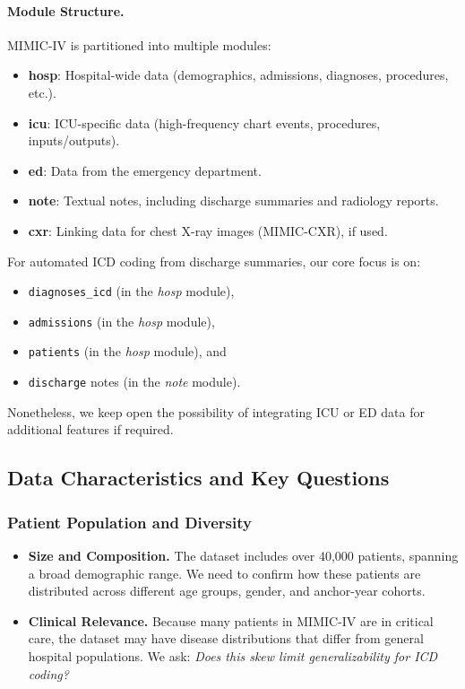 \paragraph{Module Structure.}
MIMIC-IV is partitioned into multiple modules:
\begin{itemize}
  \item \textbf{hosp}: Hospital-wide data (demographics, admissions, diagnoses, procedures, etc.).
  \item \textbf{icu}: ICU-specific data (high-frequency chart events, procedures, inputs/outputs).
  \item \textbf{ed}: Data from the emergency department.
  \item \textbf{note}: Textual notes, including discharge summaries and radiology reports.
  \item \textbf{cxr}: Linking data for chest X-ray images (MIMIC-CXR), if used.
\end{itemize}
For automated ICD coding from discharge summaries, our core focus is on:
\begin{itemize}
  \item \texttt{diagnoses\_icd} (in the \emph{hosp} module),
  \item \texttt{admissions} (in the \emph{hosp} module),
  \item \texttt{patients} (in the \emph{hosp} module), and
  \item \texttt{discharge} notes (in the \emph{note} module).
\end{itemize}
Nonetheless, we keep open the possibility of integrating ICU or ED data for additional features if required.

\subsection{Data Characteristics and Key Questions}

\subsubsection{Patient Population and Diversity}
\begin{itemize}
    \item \textbf{Size and Composition.} The dataset includes over 40,000 patients, spanning a broad demographic range. We need to confirm how these patients are distributed across different age groups, gender, and anchor-year cohorts.
    \item \textbf{Clinical Relevance.} Because many patients in MIMIC-IV are in critical care, the dataset may have disease distributions that differ from general hospital populations. We ask: \emph{Does this skew limit generalizability for ICD coding?}
\end{itemize}

